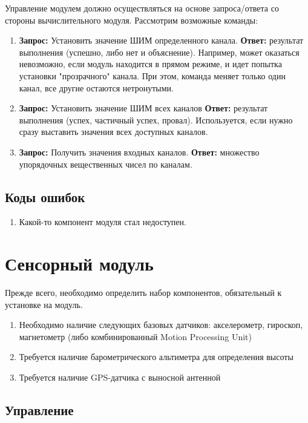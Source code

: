 \documentclass[utf8]{report}
\begin{document}
Управление модулем должно осуществляться на основе запроса/ответа со стороны вычислительного модуля. Рассмотрим возможные команды:

\begin{enumerate}
  \item \textbf{Запрос:} Установить значение ШИМ определенного канала. \textbf{Ответ:} результат выполнения (успешно, либо нет и объяснение). Например, может оказаться невозможно, если модуль находится в прямом режиме, и идет попытка установки "прозрачного" канала. При этом, команда меняет только один канал, все другие остаются нетронутыми.
  \item \textbf{Запрос:} Установить значение ШИМ всех каналов \textbf{Ответ:} результат выполнения (успех, частичный успех, провал). Используется, если нужно сразу выставить значения всех доступных каналов.
  \item \textbf{Запрос:} Получить значения входных каналов. \textbf{Ответ:} множество упорядочных вещественных чисел по каналам.
\end{enumerate}

\subsection{Коды ошибок}

\begin{enumerate}
  \item Какой-то компонент модуля стал недоступен.
\end{enumerate}


\section{Сенсорный модуль}

Прежде всего, необходимо определить набор компонентов, обязательный к установке на модуль.

\begin{enumerate}
  \item Необходимо наличие следующих базовых датчиков: акселерометр, гироскоп, магнетометр (либо комбинированный Motion Processing Unit)
  \item Требуется наличие барометрического альтиметра для определения высоты
  \item Требуется наличие GPS-датчика с выносной антенной
\end{enumerate}

\subsection{Управление}
\end{document}
